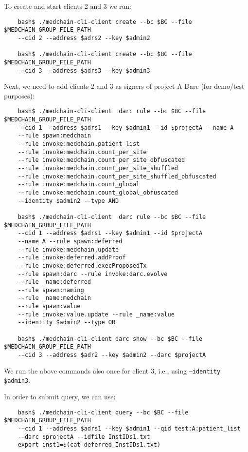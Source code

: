 To create and start clients 2 and 3 we run:
\begin{verbatim}
    bash$ ./medchain-cli-client create --bc $BC --file $MEDCHAIN_GROUP_FILE_PATH  
    --cid 2 --address $adrs2 --key $admin2
    
    bash$ ./medchain-cli-client create --bc $BC --file $MEDCHAIN_GROUP_FILE_PATH
    --cid 3 --address $adrs3 --key $admin3
\end{verbatim}

Next, we need to add clients 2 and 3 as signers of project A Darc (for demo/test purposes):

\begin{verbatim}
    bash$ ./medchain-cli-client  darc rule --bc $BC --file $MEDCHAIN_GROUP_FILE_PATH
    --cid 1 --address $adrs1 --key $admin1 --id $projectA --name A 
    --rule spawn:medchain 
    --rule invoke:medchain.patient_list 
    --rule invoke:medchain.count_per_site
    --rule invoke:medchain.count_per_site_obfuscated
    --rule invoke:medchain.count_per_site_shuffled 
    --rule invoke:medchain.count_per_site_shuffled_obfuscated 
    --rule invoke:medchain.count_global 
    --rule invoke:medchain.count_global_obfuscated 
    --identity $admin2 --type AND
    
    bash$ ./medchain-cli-client  darc rule --bc $BC --file $MEDCHAIN_GROUP_FILE_PATH  
    --cid 1 --address $adrs1 --key $admin1 --id $projectA 
    --name A --rule spawn:deferred 
    --rule invoke:medchain.update 
    --rule invoke:deferred.addProof 
    --rule invoke:deferred.execProposedTx 
    --rule spawn:darc --rule invoke:darc.evolve 
    --rule _name:deferred 
    --rule spawn:naming
    --rule _name:medchain 
    --rule spawn:value 
    --rule invoke:value.update --rule _name:value 
    --identity $admin2 --type OR
    
    bash$ ./medchain-cli-client darc show --bc $BC --file $MEDCHAIN_GROUP_FILE_PATH
    --cid 3 --address $adr2 --key $admin2 --darc $projectA

\end{verbatim}
We run the above commands also once for client 3, i.e., using \texttt{--identity \$admin3}. 

In order to submit query, we can use:

\begin{verbatim}
    bash$ ./medchain-cli-client query --bc $BC --file $MEDCHAIN_GROUP_FILE_PATH
    --cid 1 --address $adrs1 --key $admin1 --qid test:A:patient_list 
    --darc $projectA --idfile InstIDs1.txt
    export inst1=$(cat deferred_InstIDs1.txt)
\end{verbatim}

